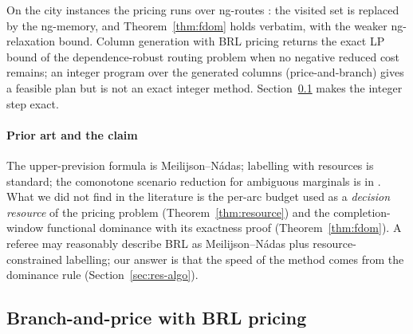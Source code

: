 \documentclass[preprint,12pt]{elsarticle}
\theoremstyle{definition}
\theoremstyle{remark}
\begin{document}
On the city instances the pricing runs over ng-routes \citep{Baldacci2011}: the visited set is replaced by the ng-memory, and Theorem~\ref{thm:fdom} holds verbatim, with the weaker ng-relaxation bound. Column generation \citep{Feillet2004,Irnich2005} with BRL pricing returns the exact LP bound of the dependence-robust routing problem when no negative reduced cost remains; an integer program over the generated columns (price-and-branch) gives a feasible plan but is not an exact integer method. Section~\ref{sec:bp} makes the integer step exact.

\paragraph{Prior art and the claim} The upper-prevision formula is Meilijson--N\'adas; labelling with resources is standard; the comonotone scenario reduction for ambiguous marginals is in \citet{GhosalHoWiesemann2024}. What we did not find in the literature is the per-arc budget used as a \emph{decision resource} of the pricing problem (Theorem~\ref{thm:resource}) and the completion-window functional dominance with its exactness proof (Theorem~\ref{thm:fdom}). A referee may reasonably describe BRL as Meilijson--N\'adas plus resource-constrained labelling; our answer is that the speed of the method comes from the dominance rule (Section~\ref{sec:res-algo}).

\subsection{Branch-and-price with BRL pricing}\label{sec:bp}
\end{document}
